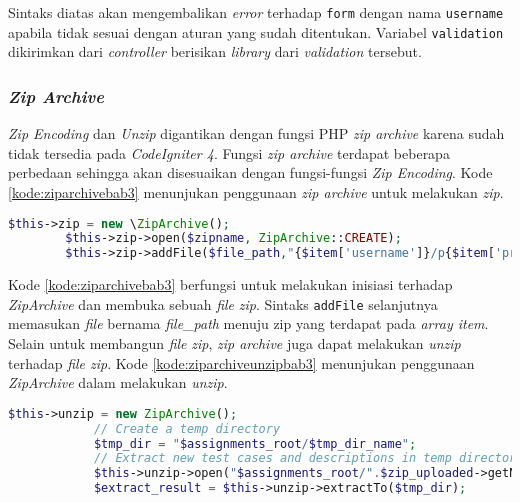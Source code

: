 Sintaks diatas akan mengembalikan \textit{error} terhadap \texttt{form} dengan nama \texttt{username} apabila tidak sesuai dengan aturan yang sudah ditentukan. Variabel \texttt{validation} dikirimkan dari \textit{controller} berisikan \textit{library} dari \textit{validation} tersebut. 

\subsubsection{\textit{Zip Archive}}
\label{subsubsec:ziparchivebab3}
\textit{Zip Encoding} dan \textit{Unzip} digantikan dengan fungsi PHP \textit{zip archive} karena sudah tidak tersedia pada \textit{CodeIgniter 4}. Fungsi \textit{zip archive} terdapat beberapa perbedaan sehingga akan disesuaikan dengan fungsi-fungsi \textit{Zip Encoding}. Kode \ref{kode:ziparchivebab3} menunjukan penggunaan \textit{zip archive} untuk melakukan \textit{zip}.

\begin{lstlisting}[language=PHP, caption=Contoh perubahan penggunaan \textit{library Zip Archive} untuk melakukan \textit{zip}, label=kode:ziparchivebab3]
		$this->zip = new \ZipArchive();
		$this->zip->open($zipname, ZipArchive::CREATE);
		$this->zip->addFile($file_path,"{$item['username']}/p{$item['problem']}.".filetype_to_extension($item['file_type']));
\end{lstlisting}

Kode \ref{kode:ziparchivebab3} berfungsi untuk melakukan inisiasi terhadap \textit{ZipArchive} dan membuka sebuah \textit{file} \textit{zip}. Sintaks \texttt{addFile} selanjutnya memasukan \textit{file} bernama \textit{file\_path} menuju zip yang terdapat pada \textit{array item}. Selain untuk membangun \textit{file} \textit{zip}, \textit{zip archive} juga dapat melakukan \textit{unzip} terhadap \textit{file zip}. Kode \ref{kode:ziparchiveunzipbab3} menunjukan penggunaan \textit{ZipArchive} dalam melakukan \textit{unzip}.
\begin{lstlisting}[language=PHP, caption=Contoh perubahan penggunaan \textit{library Zip Archive} untuk melakukan \textit{unzip}, label=kode:ziparchiveunzipbab3]
		$this->unzip = new ZipArchive();
			// Create a temp directory
			$tmp_dir = "$assignments_root/$tmp_dir_name";
			// Extract new test cases and descriptions in temp directory
			$this->unzip->open("$assignments_root/".$zip_uploaded->getName());
			$extract_result = $this->unzip->extractTo($tmp_dir);
\end{lstlisting}

